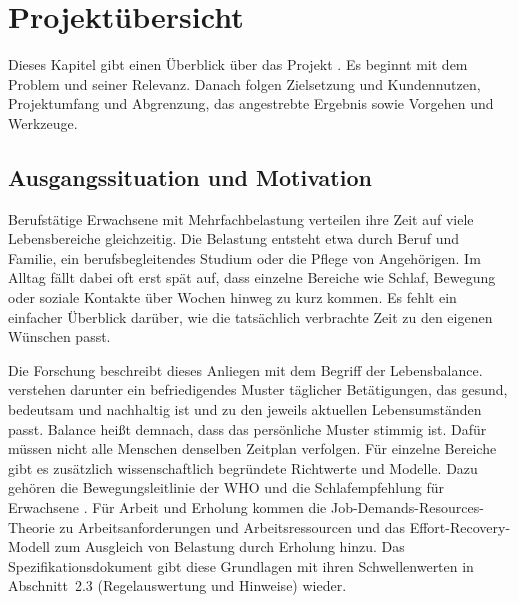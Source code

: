 \section{Projektübersicht}
Dieses Kapitel gibt einen Überblick über das Projekt \Projektname{}. Es beginnt mit dem Problem und seiner Relevanz. Danach folgen Zielsetzung und Kundennutzen, Projektumfang und Abgrenzung, das angestrebte Ergebnis sowie Vorgehen und Werkzeuge.

\subsection{Ausgangssituation und Motivation}
Berufstätige Erwachsene mit Mehrfachbelastung verteilen ihre Zeit auf viele Lebensbereiche gleichzeitig. Die Belastung entsteht etwa durch Beruf und Familie, ein berufsbegleitendes Studium oder die Pflege von Angehörigen. Im Alltag fällt dabei oft erst spät auf, dass einzelne Bereiche wie Schlaf, Bewegung oder soziale Kontakte über Wochen hinweg zu kurz kommen. Es fehlt ein einfacher Überblick darüber, wie die tatsächlich verbrachte Zeit zu den eigenen Wünschen passt.

Die Forschung beschreibt dieses Anliegen mit dem Begriff der Lebensbalance. \textcite[S.~11]{matuska2008} verstehen darunter ein befriedigendes Muster täglicher Betätigungen, das gesund, bedeutsam und nachhaltig ist und zu den jeweils aktuellen Lebensumständen passt. Balance heißt demnach, dass das persönliche Muster stimmig ist. Dafür müssen nicht alle Menschen denselben Zeitplan verfolgen. Für einzelne Bereiche gibt es zusätzlich wissenschaftlich begründete Richtwerte und Modelle. Dazu gehören die Bewegungsleitlinie der \ac{WHO} \parencite[S.~1451]{bull2020} und die Schlafempfehlung für Erwachsene \parencite[S.~843]{watson2015}. Für Arbeit und Erholung kommen die Job-Demands-Resources-Theorie zu Arbeitsanforderungen und Arbeitsressourcen \parencite[S.~274]{bakker2017} und das Effort-Recovery-Modell zum Ausgleich von Belastung durch Erholung \parencite[S.~5--33]{meijman1998} hinzu. Das Spezifikationsdokument gibt diese Grundlagen mit ihren Schwellenwerten in Abschnitt~2.3 (Regelauswertung und Hinweise) wieder.

